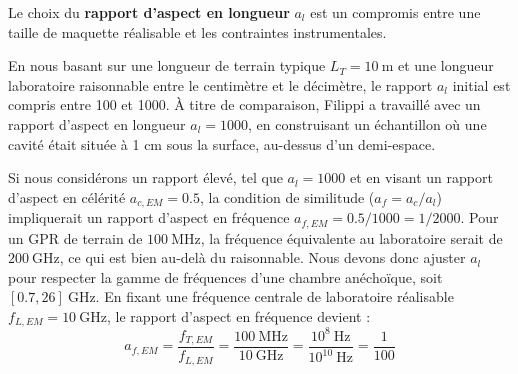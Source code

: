 

Le choix du \textbf{rapport d'aspect en longueur} $a_l$ est un compromis entre une taille de maquette réalisable et les contraintes instrumentales.\par

En nous basant sur une longueur de terrain typique $L_T = 10~\text{m}$ et une longueur laboratoire raisonnable entre le centimètre et le décimètre, le rapport $a_l$ initial est compris entre 100 et 1000. À titre de comparaison, Filippi a travaillé avec un rapport d’aspect en longueur $a_l = 1000$, en construisant un échantillon où une cavité était située à 1 cm sous la surface, au-dessus d'un demi-espace. \par

Si nous considérons un rapport élevé, tel que $a_l = 1000$ et en visant un rapport d'aspect en célérité $a_{c,EM} = 0.5$, la condition de similitude ($a_f = a_c/a_{l}$) impliquerait un rapport d'aspect en fréquence $a_{f,EM} = 0.5/1000 = 1/2000$. Pour un GPR de terrain de $100~\text{MHz}$, la fréquence équivalente au laboratoire serait de $200~\text{GHz}$, ce qui est bien au-delà du raisonnable. Nous devons donc ajuster $a_l$ pour respecter la gamme de fréquences d'une chambre anéchoïque, soit $[0.7, 26]~\text{GHz}$. En fixant une fréquence centrale de laboratoire réalisable $f_{L,EM} = 10~\text{GHz}$, le rapport d'aspect en fréquence devient :
\begin{equation}
    a_{f,EM} = \frac{f_{T,EM}}{f_{L,EM}} = \frac{100~\text{MHz}}{10~\text{GHz}} = \frac{10^8~\text{Hz}}{10^{10}~\text{Hz}} = \frac{1}{100}
\end{equation}

